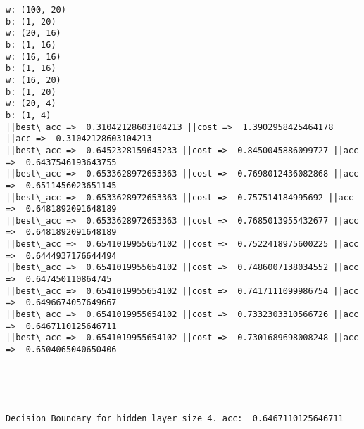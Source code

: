 \documentclass[11pt]{article}
\begin{document}
    \begin{Verbatim}[commandchars=\\\{\}]
w: (100, 20)
b: (1, 20)
w: (20, 16)
b: (1, 16)
w: (16, 16)
b: (1, 16)
w: (16, 20)
b: (1, 20)
w: (20, 4)
b: (1, 4)
||best\_acc =>  0.31042128603104213 ||cost =>  1.3902958425464178 ||acc =>  0.31042128603104213
||best\_acc =>  0.6452328159645233 ||cost =>  0.8450045886099727 ||acc =>  0.6437546193643755
||best\_acc =>  0.6533628972653363 ||cost =>  0.7698012436082868 ||acc =>  0.6511456023651145
||best\_acc =>  0.6533628972653363 ||cost =>  0.757514184995692 ||acc =>  0.6481892091648189
||best\_acc =>  0.6533628972653363 ||cost =>  0.7685013955432677 ||acc =>  0.6481892091648189
||best\_acc =>  0.6541019955654102 ||cost =>  0.7522418975600225 ||acc =>  0.6444937176644494
||best\_acc =>  0.6541019955654102 ||cost =>  0.7486007138034552 ||acc =>  0.647450110864745
||best\_acc =>  0.6541019955654102 ||cost =>  0.7417111099986754 ||acc =>  0.6496674057649667
||best\_acc =>  0.6541019955654102 ||cost =>  0.7332303310566726 ||acc =>  0.6467110125646711
||best\_acc =>  0.6541019955654102 ||cost =>  0.7301689698008248 ||acc =>  0.6504065040650406

    \end{Verbatim}

    \begin{center}
    \end{center}
    { \hspace*{\fill} \\}
    
    \begin{center}
    \end{center}
    { \hspace*{\fill} \\}
    
    \begin{Verbatim}[commandchars=\\\{\}]
Decision Boundary for hidden layer size 4. acc:  0.6467110125646711

    \end{Verbatim}
\end{document}
